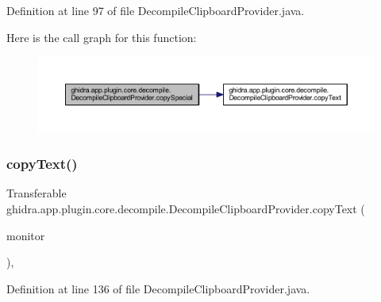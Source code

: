 Definition at line 97 of file Decompile\+Clipboard\+Provider.\+java.

Here is the call graph for this function\+:
\nopagebreak
\begin{figure}[H]
\begin{center}
\leavevmode
\includegraphics[width=350pt]{classghidra_1_1app_1_1plugin_1_1core_1_1decompile_1_1_decompile_clipboard_provider_a508c7b98f33673f883e47ba7c3ba60cf_cgraph}
\end{center}
\end{figure}
\mbox{\label{classghidra_1_1app_1_1plugin_1_1core_1_1decompile_1_1_decompile_clipboard_provider_aabb3e58f9df2de785e528b4ddc06a285}} 
\subsubsection{\texorpdfstring{copyText()}{copyText()}}
{\footnotesize\ttfamily Transferable ghidra.\+app.\+plugin.\+core.\+decompile.\+Decompile\+Clipboard\+Provider.\+copy\+Text (\begin{DoxyParamCaption}\item[{Task\+Monitor}]{monitor }\end{DoxyParamCaption})\hspace{0.3cm}{\ttfamily [inline]}, {\ttfamily [protected]}}



Definition at line 136 of file Decompile\+Clipboard\+Provider.\+java.

